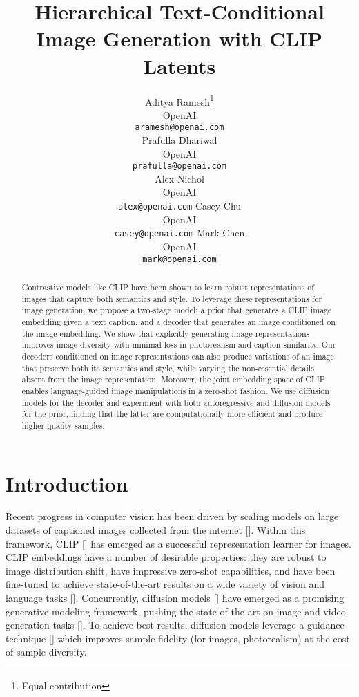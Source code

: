 \documentclass{article}
\title{Hierarchical Text-Conditional\\ Image Generation with CLIP Latents}
\author{
  Aditya Ramesh\thanks{Equal contribution} \\
  OpenAI \\
  \texttt{aramesh@openai.com} \\
  \And
  Prafulla Dhariwal\footnotemark[1] \\
  OpenAI \\
  \texttt{prafulla@openai.com} \\
  \And
  Alex Nichol\footnotemark[1]\\
  OpenAI \\
  \texttt{alex@openai.com}
  \And
  Casey Chu\footnotemark[1]\\
  OpenAI \\
  \texttt{casey@openai.com}
  \And
  Mark Chen\\
  OpenAI \\
  \texttt{mark@openai.com}
}
\newcommand{\shortcite}[1]{[\citenum{#1}]}
\begin{document}
\maketitle

\begin{abstract}
Contrastive models like CLIP have been shown to learn robust representations of images that capture both semantics and style. To leverage these representations for image generation, we propose a two-stage model: a prior that generates a CLIP image embedding given a text caption, and a decoder that generates an image conditioned on the image embedding. We show that explicitly generating image representations improves image diversity with minimal loss in photorealism and caption similarity. Our decoders conditioned on image representations can also produce variations of an image that preserve both its semantics and style, while varying the non-essential details absent from the image representation. Moreover, the joint embedding space of CLIP enables language-guided image manipulations in a zero-shot fashion. We use diffusion models for the decoder and experiment with both autoregressive and diffusion models for the prior, finding that the latter are computationally more efficient and produce higher-quality samples.
\end{abstract}

\section{Introduction}

Recent progress in computer vision has been driven by scaling models on large datasets of captioned images collected from the internet \shortcite{virtex,icmlm,convirt,clip,slip,cloob}. Within this framework, CLIP \shortcite{clip} has emerged as a successful representation learner for images. CLIP embeddings have a number of desirable properties: they are robust to image distribution shift, have impressive zero-shot capabilities, and have been fine-tuned to achieve state-of-the-art results on a wide variety of vision and language tasks \shortcite{clipbenefit}. Concurrently, diffusion models \shortcite{dickstein,improvedscore,ddpm} have emerged as a promising generative modeling framework, pushing the state-of-the-art on image and video generation tasks \shortcite{sotapaper,cascaded,uncond}. To achieve best results, diffusion models leverage a guidance technique \shortcite{sotapaper,uncond} which improves sample fidelity (for images, photorealism) at the cost of sample diversity.
\end{document}
